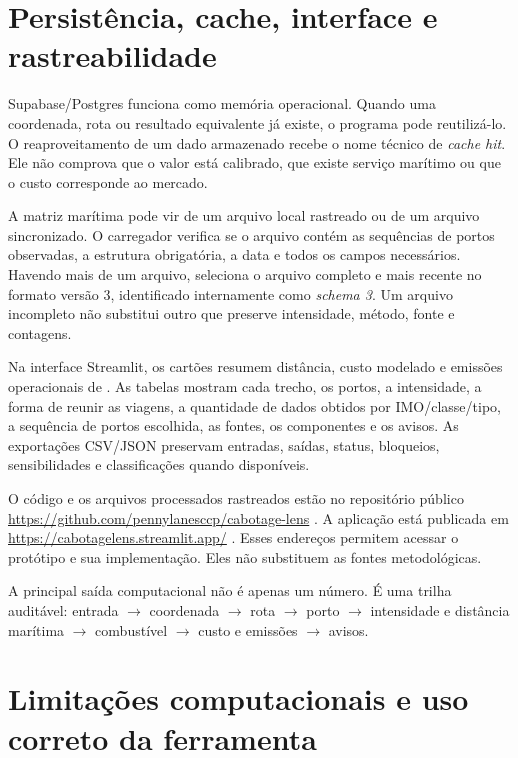 \section{Persistência, cache, interface e rastreabilidade}
\label{sec:persistencia-cache-interface}

Supabase/Postgres funciona como memória operacional. Quando uma coordenada, rota ou resultado equivalente já existe, o programa pode reutilizá-lo. O reaproveitamento de um dado armazenado recebe o nome técnico de \emph{cache hit}. Ele não comprova que o valor está calibrado, que existe serviço marítimo ou que o custo corresponde ao mercado.

A matriz marítima pode vir de um arquivo local rastreado ou de um arquivo sincronizado. O carregador verifica se o arquivo contém as sequências de portos observadas, a estrutura obrigatória, a data e todos os campos necessários. Havendo mais de um arquivo, seleciona o arquivo completo e mais recente no formato versão 3, identificado internamente como \emph{schema 3}. Um arquivo incompleto não substitui outro que preserve intensidade, método, fonte e contagens.

Na interface Streamlit, os cartões resumem distância, custo modelado e emissões operacionais \ttw{} de \cooe{}. As tabelas mostram cada trecho, os portos, a intensidade, a forma de reunir as viagens, a quantidade de dados obtidos por IMO/classe/tipo, a sequência de portos escolhida, as fontes, os componentes e os avisos. As exportações CSV/JSON preservam entradas, saídas, status, bloqueios, sensibilidades e classificações quando disponíveis.

O código e os arquivos processados rastreados estão no repositório público \url{https://github.com/pennylanesccp/cabotage-lens} \cite{cabotagelensrepo}. A aplicação está publicada em \url{https://cabotagelens.streamlit.app/} \cite{cabotagelensapp}. Esses endereços permitem acessar o protótipo e sua implementação. Eles não substituem as fontes metodológicas.

A principal saída computacional não é apenas um número. É uma trilha auditável: entrada \(\rightarrow\) coordenada \(\rightarrow\) rota \(\rightarrow\) porto \(\rightarrow\) intensidade e distância marítima \(\rightarrow\) combustível \(\rightarrow\) custo e emissões \(\rightarrow\) avisos.

\section{Limitações computacionais e uso correto da ferramenta}
\label{sec:limitacoes-computacionais}

